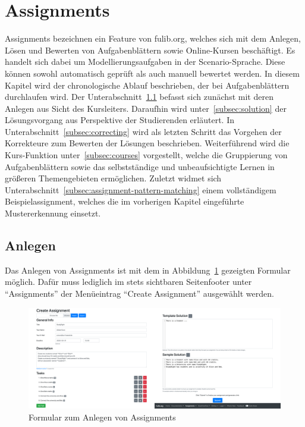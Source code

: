 \section{Assignments}\label{sec:assignments}

Assignments bezeichnen ein Feature von fulib.org, welches sich mit dem Anlegen, Lösen und Bewerten von Aufgabenblättern sowie Online-Kursen beschäftigt.
Es handelt sich dabei um Modellierungsaufgaben in der Scenario-Sprache.
Diese können sowohl automatisch geprüft als auch manuell bewertet werden.
In diesem Kapitel wird der chronologische Ablauf beschrieben, der bei Aufgabenblättern durchlaufen wird.
Der Unterabschnitt~\ref{subsec:creation} befasst sich zunächst mit deren Anlegen aus Sicht des Kursleiters.
Daraufhin wird unter~\ref{subsec:solution} der Lösungsvorgang aus Perspektive der Studierenden erläutert.
In Unterabschnitt~\ref{subsec:correcting} wird als letzten Schritt das Vorgehen der Korrekteure zum Bewerten der Lösungen beschrieben.
Weiterführend wird die Kurs-Funktion unter~\ref{subsec:courses} vorgestellt, welche die Gruppierung von Aufgabenblättern sowie das selbstständige und unbeaufsichtigte Lernen in größeren Themengebieten ermöglichen.
Zuletzt widmet sich Unterabschnitt~\ref{subsec:assignment-pattern-matching} einem vollständigem Beispielassignment, welches die im vorherigen Kapitel eingeführte Mustererkennung einsetzt.

\subsection{Anlegen}\label{subsec:creation}

Das Anlegen von Assignments ist mit dem in Abbildung~\ref{fig:create-assignment} gezeigten Formular möglich.
Dafür muss lediglich im stets sichtbaren Seitenfooter unter ``Assignments'' der Menüeintrag ``Create Assignment'' ausgewählt werden.

\begin{figure}
    \centering
    \includegraphics[width=\textwidth]{chapter/fulib.org/img/create-assignment.png}
    \caption{Formular zum Anlegen von Assignments}
    \label{fig:create-assignment}
\end{figure}

